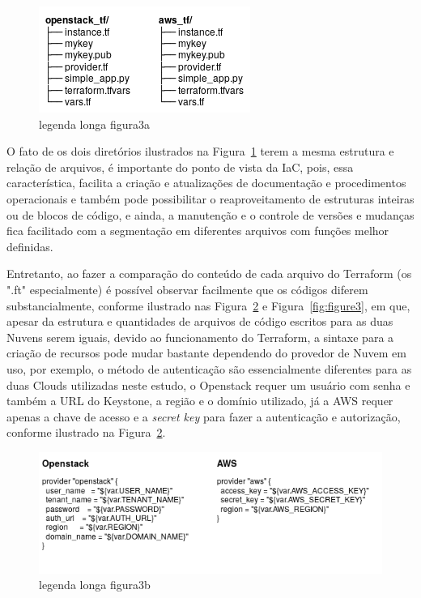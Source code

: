 \documentclass[12pt]{article}
\begin{document}
	\begin{figure}[ht]
		\centering
		\includegraphics[width=0.45\linewidth]{figuras/Figure3a.png}
		\caption{legenda longa figura3a}
		\label{fig:figure3a}
	\end{figure}
	
	O fato de os dois diretórios ilustrados na Figura~\ref{fig:figure3a} terem a mesma estrutura e relação de arquivos, é importante do ponto de vista da IaC, pois, essa característica, facilita a criação e atualizações de documentação e procedimentos operacionais e também pode possibilitar o reaproveitamento de estruturas inteiras ou de blocos de código, e ainda, a manutenção e o controle de versões e mudanças fica facilitado com a segmentação em diferentes arquivos com funções melhor definidas.  
	
	Entretanto, ao fazer a comparação do conteúdo de cada arquivo do Terraform (os ".ft" especialmente) é possível observar facilmente que os códigos diferem substancialmente, conforme ilustrado nas Figura~\ref{fig:figure3b} e Figura~\ref{fig:figure3}, em que, apesar da estrutura e quantidades de arquivos de código escritos para as duas Nuvens serem iguais, devido ao funcionamento do Terraform, a sintaxe para a criação de recursos pode mudar bastante dependendo do provedor de Nuvem em uso, por exemplo, o método de autenticação são essencialmente diferentes para as duas Clouds utilizadas neste estudo, o Openstack requer um usuário com senha e também a URL do Keystone, a região e o domínio utilizado, já a AWS requer apenas a chave de acesso e a \textit{secret key} para fazer a autenticação e autorização, conforme ilustrado na Figura~\ref{fig:figure3b}. 
		
	\begin{figure}[H]
		\centering
		\includegraphics[width=0.82\linewidth]{figuras/Figure3b.png}
		\caption{legenda longa figura3b}
		\label{fig:figure3b}
	\end{figure}
	
\end{document}
